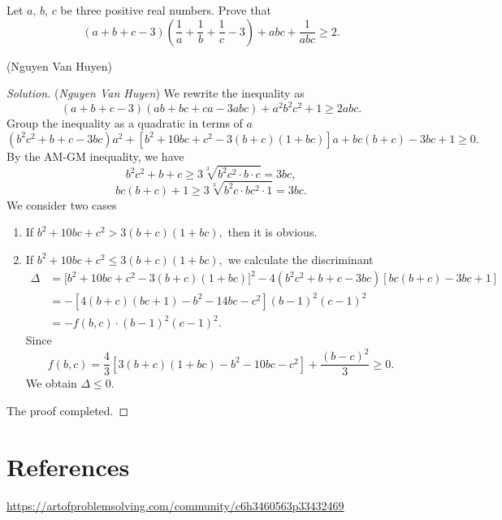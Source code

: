 \documentclass[12pt,a4paper]{book}
\begin{document}
\begin{pro_no_count}
Let $a,\,b,\,c$ be three positive real numbers. Prove that
\[(a+b+c-3)\left(\frac{1}{a}+\frac{1}{b}+\frac{1}{c}-3\right)+abc+\frac{1}{abc} \geqslant 2.\]
\begin{flushright}(Nguyen Van Huyen)\end{flushright}
\end{pro_no_count}

\begin{proof}[\cmss\problemColor Solution] (\textit{Nguyen Van Huyen}) We rewrite the inequality as
\[(a+b+c-3)(ab+bc+ca-3abc)+a^2b^2c^2+1 \geqslant 2abc.\]
Group the inequality as a quadratic in terms of $a$
\[(b^2c^2+b+c-3bc)a^2 + [b^2+10bc+c^2 - 3(b+c)(1+bc)]a + bc(b+c) - 3bc + 1 \ge 0.\]
By the AM-GM inequality, we have
\[b^2c^2+b+c \geqslant 3\sqrt[3]{b^2c^2 \cdot b \cdot c} = 3bc,\]
\[bc(b+c) + 1 \geqslant 3\sqrt[3]{b^2c \cdot bc^2 \cdot 1} = 3bc.\]
We consider two cases
\begin{enumerate}[(1)]
\item If $b^2+10bc+c^2 > 3(b+c)(1+bc),$ then it is obvious.
\item If $b^2+10bc+c^2 \le 3(b+c)(1+bc),$ we calculate the discriminant
\[\begin{aligned}
\Delta &= \big[b^2+10bc+c^2 - 3(b+c)(1+bc)\big]^2 - 4(b^2c^2+b+c-3bc)[bc(b+c) - 3bc + 1] \\
&= -[4(b+c)(bc+1) - b^2-14bc-c^2](b-1)^2(c-1)^2 \\
&= - f(b,c) \cdot (b-1)^2(c-1)^2.
\end{aligned}\]
Since 
\[f(b,c) = \frac{4}{3}[3(b+c)(1+bc)-b^2-10bc-c^2]+\frac{(b-c)^2}{3} \ge 0.\] 
We obtain $\Delta \le 0.$
\end{enumerate}
The proof completed.
\end{proof}

\section*{References}

\begin{enumerate}[label={[\arabic*]}]
\item \href{https://artofproblemsolving.com/community/c6h3460563p33432469}{\url{https://artofproblemsolving.com/community/c6h3460563p33432469}}
\end{enumerate}
\end{document}
